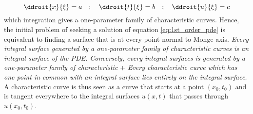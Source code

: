 \begin{equation}
  \label{eq:charac_curve}
  \ddroit{x}{\xi} = a \quad ; \quad \ddroit{t}{\xi} = b  \quad ; \quad \ddroit{u}{\xi} = c
\end{equation}
which integration gives a one-parameter family of characteristic curves. Hence, the initial problem of seeking a solution of equation \eqref{eq:1st_order_pde} is equivalent to finding a surface that is at every point normal to Monge axis. \textit{Every integral surface generated by a one-parameter family of characteristic curves is an integral surface of the PDE. Conversely, every integral surfaces is generated by a one-parameter family of characteristic \cite[Chapter~2]{Courant}} + \textit{Every characteristic curve which has one point in common with an integral surface lies entirely on the integral surface.} A characteristic curve is thus seen as a curve that starts at a point $(x_0,t_0)$ and is tangent everywhere to the integral surfaces $u(x,t)$ that passes through $u(x_0,t_0)$.


